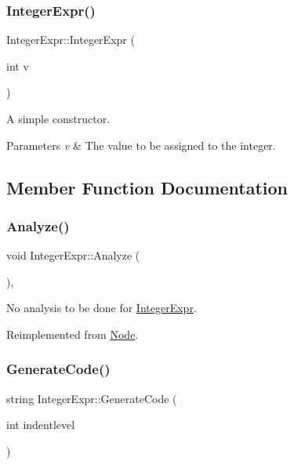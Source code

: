 \subsubsection{\texorpdfstring{Integer\+Expr()}{IntegerExpr()}}
{\footnotesize\ttfamily Integer\+Expr\+::\+Integer\+Expr (\begin{DoxyParamCaption}\item[{int}]{v }\end{DoxyParamCaption})}

A simple constructor. 
\begin{DoxyParams}{Parameters}
{\em v} & The value to be assigned to the integer. \\
\hline
\end{DoxyParams}


\subsection{Member Function Documentation}
\mbox{\label{class_integer_expr_a523ca156f0653534b5c142fd496de7a4}} 
\subsubsection{\texorpdfstring{Analyze()}{Analyze()}}
{\footnotesize\ttfamily void Integer\+Expr\+::\+Analyze (\begin{DoxyParamCaption}{ }\end{DoxyParamCaption})\hspace{0.3cm}{\ttfamily [inline]}, {\ttfamily [virtual]}}

No analysis to be done for \hyperlink{class_integer_expr}{Integer\+Expr}. 

Reimplemented from \hyperlink{class_node_a5f88d55c6f253a29def7ccc443d83d47}{Node}.

\mbox{\label{class_integer_expr_a72e48794bcd8c04bfeea19d1057636be}} 
\subsubsection{\texorpdfstring{Generate\+Code()}{GenerateCode()}}
{\footnotesize\ttfamily string Integer\+Expr\+::\+Generate\+Code (\begin{DoxyParamCaption}\item[{int}]{indentlevel }\end{DoxyParamCaption})\hspace{0.3cm}{\ttfamily [virtual]}}

